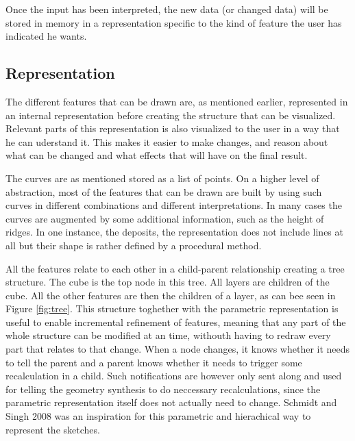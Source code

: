 \documentclass[a4paper,12pt]{report}
\begin{document}
Once the input has been interpreted, the new data (or changed data) will be stored in memory in a representation specific to the kind of feature the user has indicated he wants.

\subsection{Representation}
The different features that can be drawn are, as mentioned earlier, represented in an internal representation before creating the structure that can be visualized. Relevant parts of this representation is also visualized to the user in a way that he can uderstand it. This makes it easier to make changes, and reason about what can be changed and what effects that will have on the final result.

The curves are as mentioned stored as a list of points. On a higher level of abstraction, most of the features that can be drawn are built by using such curves in different combinations and different interpretations. In many cases the curves are augmented by some additional information, such as the height of ridges. In one instance, the deposits, the representation does not include lines at all but their shape is rather defined by a procedural method.

All the features relate to each other in a child-parent relationship creating a tree structure. The cube is the top node in this tree. All layers are children of the cube. All the other features are then the children of a layer, as can bee seen in Figure \ref{fig:tree}. This structure toghether with the parametric representation is useful to enable incremental refinement of features, meaning that any part of the whole structure can be modified at an time, withouth having to redraw every part that relates to that change. When a node changes, it knows whether it needs to tell the parent and a parent knows whether it needs to trigger some recalculation in a child. Such notifications are however only sent along and used for telling the geometry synthesis to do neccessary recalculations, since the parametric representation itself does not actually need to change. Schmidt and Singh 2008 \cite{CGF:CGF1129} was an inspiration for this parametric and hierachical way to represent the sketches.
\end{document}
